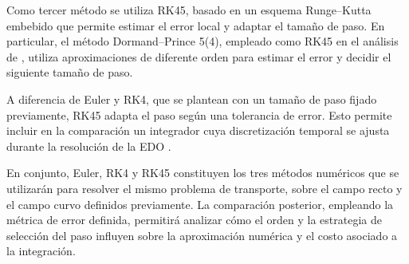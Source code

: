 \documentclass[final,5p,times,twocolumn,authoryear]{elsarticle}
\begin{document}
Como tercer método se utiliza RK45, basado en un esquema Runge--Kutta embebido que permite estimar el error local y adaptar el tamaño de paso. En particular, el método Dormand--Prince 5(4), empleado como RK45 en el análisis de \citet{xiao2026solvers}, utiliza aproximaciones de diferente orden para estimar el error y decidir el siguiente tamaño de paso.

A diferencia de Euler y RK4, que se plantean con un tamaño de paso fijado previamente, RK45 adapta el paso según una tolerancia de error. Esto permite incluir en la comparación un integrador cuya discretización temporal se ajusta durante la resolución de la EDO \citep{xiao2026solvers}.

En conjunto, Euler, RK4 y RK45 constituyen los tres métodos numéricos que se utilizarán para resolver el mismo problema de transporte, sobre el campo recto y el campo curvo definidos previamente. La comparación posterior, empleando la métrica de error definida, permitirá analizar cómo el orden y la estrategia de selección del paso influyen sobre la aproximación numérica y el costo asociado a la integración.
\end{document}
